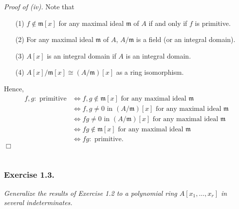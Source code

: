 \documentclass{article}
\begin{document}
\emph{Proof of (iv).}
Note that
\begin{enumerate}
\item[(1)]
  $f \notin \mathfrak{m}[x]$ for any maximal ideal $\mathfrak{m}$ of $A$
  if and only if $f$ is primitive.

\item[(2)]
  For any maximal ideal $\mathfrak{m}$ of $A$,
  $A/\mathfrak{m}$ is a field (or an integral domain).

\item[(3)]
  $A[x]$ is an integral domain if $A$ is an integral domain.

\item[(4)]
  $A[x]/\mathfrak{m}[x] \cong (A/\mathfrak{m})[x]$ as a ring isomorphism.
  \end{enumerate}
  Hence,
  \begin{align*}
    f, g:\text{ primitive}
    &\Longleftrightarrow
    f, g \notin \mathfrak{m}[x] \text{ for any maximal ideal } \mathfrak{m} \\
    &\Longleftrightarrow
    f, g \neq 0 \text{ in } (A/\mathfrak{m})[x] \text{ for any maximal ideal } \mathfrak{m} \\
    &\Longleftrightarrow
    fg \neq 0 \text{ in } (A/\mathfrak{m})[x] \text{ for any maximal ideal } \mathfrak{m} \\
    &\Longleftrightarrow
    fg \notin \mathfrak{m}[x] \text{ for any maximal ideal } \mathfrak{m} \\
    &\Longleftrightarrow
    fg:\text{ primitive}.
  \end{align*}
$\Box$ \\\\






\subsubsection*{Exercise 1.3.}
\emph{Generalize the results of Exercise 1.2 to a polynomial ring
$A[x_1, \ldots, x_r]$ in several indeterminates.} \\
\end{document}
